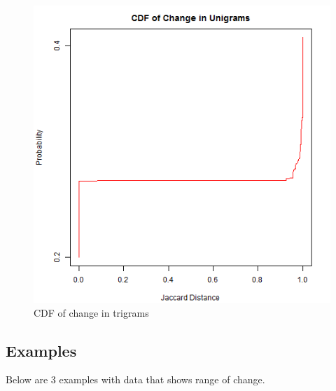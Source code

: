 \newpage
\begin{figure}[ht]
	\begin{center}
		 \includegraphics[scale=0.60]{Trigramq1}
		  \caption{CDF of change in trigrams}
	 \end{center}
\end{figure}
\newpage
\subsection{Examples}
Below are 3 examples with data that shows range of change.

